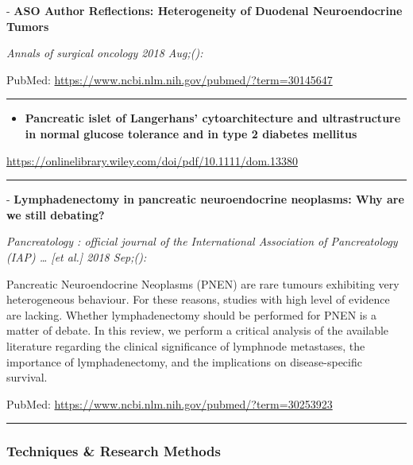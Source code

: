 \documentclass[]{article}
\providecommand{\tightlist}{%
  \setlength{\itemsep}{0pt}\setlength{\parskip}{0pt}}
\begin{document}
 - \textbf{ASO Author Reflections: Heterogeneity of Duodenal
Neuroendocrine Tumors}

\emph{Annals of surgical oncology 2018 Aug;():}

PubMed: \url{https://www.ncbi.nlm.nih.gov/pubmed/?term=30145647}

{}

{}

\begin{center}\rule{0.5\linewidth}{\linethickness}\end{center}

\begin{itemize}
\tightlist
\item
  \textbf{Pancreatic islet of Langerhans' cytoarchitecture and
  ultrastructure in normal glucose tolerance and in type 2 diabetes
  mellitus}
\end{itemize}

\url{https://onlinelibrary.wiley.com/doi/pdf/10.1111/dom.13380}

\begin{center}\rule{0.5\linewidth}{\linethickness}\end{center}

 - \textbf{Lymphadenectomy in pancreatic neuroendocrine neoplasms: Why
are we still debating?}

\emph{Pancreatology : official journal of the International Association
of Pancreatology (IAP) \ldots{} {[}et al.{]} 2018 Sep;():}

Pancreatic Neuroendocrine Neoplasms (PNEN) are rare tumours exhibiting
very heterogeneous behaviour. For these reasons, studies with high level
of evidence are lacking. Whether lymphadenectomy should be performed for
PNEN is a matter of debate. In this review, we perform a critical
analysis of the available literature regarding the clinical significance
of lymphnode metastases, the importance of lymphadenectomy, and the
implications on disease-specific survival.

PubMed: \url{https://www.ncbi.nlm.nih.gov/pubmed/?term=30253923}

{}

{}

\begin{center}\rule{0.5\linewidth}{\linethickness}\end{center}

\hypertarget{techniques-research-methods}{%
\subsubsection{Techniques \& Research
Methods}\label{techniques-research-methods}}
\end{document}
